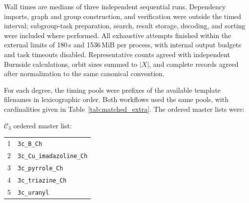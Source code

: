\documentclass[a5paper, 10pt]{article}
\begin{document}
Wall times are medians of three independent sequential runs. Dependency imports, graph and group construction, and verification were outside the timed interval; subgroup-task preparation, search, result storage, decoding, and sorting were included where performed. All exhaustive attempts finished within the external limits of 180\,s and 1536\,MiB per process, with internal output budgets and task timeouts disabled. Representative counts agreed with independent Burnside calculations, orbit sizes summed to $|X|$, and complete records agreed after normalization to the same canonical convention.

For each degree, the timing pools were prefixes of the available template filenames in lexicographic order. Both workflows used the same pools, with cardinalities given in Table~\ref{tab:matched_extra}. The ordered master lists were:

\noindent $\mathcal{C}_{3}$ ordered master list:
\begin{center}\small
\begin{tabular}{rl}
1 & \texttt{3c\_B\_Ch} \\
2 & \texttt{3c\_Cu\_imadazoline\_Ch} \\
3 & \texttt{3c\_pyrrole\_Ch} \\
4 & \texttt{3c\_triazine\_Ch} \\
5 & \texttt{3c\_uranyl} \\
\end{tabular}
\end{center}
\end{document}
